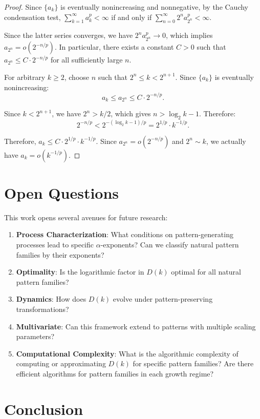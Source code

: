 \documentclass[11pt]{article}
\theoremstyle{definition}
\begin{document}
\begin{proof}
Since $\{a_k\}$ is eventually nonincreasing and nonnegative, by the Cauchy condensation test, $\sum_{k=1}^\infty a_k^p < \infty$ if and only if $\sum_{n=0}^\infty 2^n a_{2^n}^p < \infty$.

Since the latter series converges, we have $2^n a_{2^n}^p \to 0$, which implies $a_{2^n} = o(2^{-n/p})$. In particular, there exists a constant $C > 0$ such that $a_{2^n} \leq C \cdot 2^{-n/p}$ for all sufficiently large $n$.

For arbitrary $k \geq 2$, choose $n$ such that $2^n \leq k < 2^{n+1}$. Since $\{a_k\}$ is eventually nonincreasing:
$$a_k \leq a_{2^n} \leq C \cdot 2^{-n/p}.$$

Since $k < 2^{n+1}$, we have $2^n > k/2$, which gives $n > \log_2 k - 1$. Therefore:
$$2^{-n/p} < 2^{-(\log_2 k - 1)/p} = 2^{1/p} \cdot k^{-1/p}.$$

Therefore, $a_k \leq C \cdot 2^{1/p} \cdot k^{-1/p}$. Since $a_{2^n} = o(2^{-n/p})$ and $2^n \sim k$, we actually have $a_k = o(k^{-1/p})$.
\end{proof}

\section{Open Questions}

This work opens several avenues for future research:

\begin{enumerate}
\item \textbf{Process Characterization}: What conditions on pattern-generating processes lead to specific $\alpha$-exponents? Can we classify natural pattern families by their exponents?
\item \textbf{Optimality}: Is the logarithmic factor in $D(k)$ optimal for all natural pattern families?
\item \textbf{Dynamics}: How does $D(k)$ evolve under pattern-preserving transformations?
\item \textbf{Multivariate}: Can this framework extend to patterns with multiple scaling parameters?
\item \textbf{Computational Complexity}: What is the algorithmic complexity of computing or approximating $D(k)$ for specific pattern families? Are there efficient algorithms for pattern families in each growth regime?
\end{enumerate}

\section{Conclusion}
\end{document}
